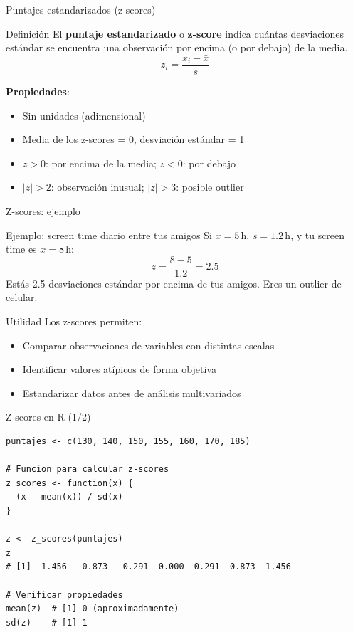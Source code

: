 \documentclass[aspectratio=169, 11pt]{beamer}
\begin{document}
\begin{frame}{Puntajes estandarizados (z-scores)}
\begin{block}{Definición}
El \textbf{puntaje estandarizado} o \textbf{z-score} indica cuántas desviaciones estándar se encuentra una observación por encima (o por debajo) de la media.
\[
z_i = \frac{x_i - \bar{x}}{s}
\]
\end{block}

\textbf{Propiedades}:
\begin{itemize}
\item Sin unidades (adimensional)
\item Media de los z-scores = 0, desviación estándar = 1
\item $z > 0$: por encima de la media; $z < 0$: por debajo
\item $|z| > 2$: observación inusual; $|z| > 3$: posible outlier
\end{itemize}
\end{frame}

\begin{frame}{Z-scores: ejemplo}
\begin{exampleblock}{Ejemplo: screen time diario entre tus amigos}
Si $\bar{x} = 5$\,h, $s = 1.2$\,h, y tu screen time es $x = 8$\,h:
\[
z = \frac{8 - 5}{1.2} = 2.5
\]
Est\'as 2.5 desviaciones est\'andar por encima de tus amigos. Eres un outlier de celular.
\end{exampleblock}

\vspace{1em}
\begin{alertblock}{Utilidad}
Los z-scores permiten:
\begin{itemize}
\item Comparar observaciones de variables con distintas escalas
\item Identificar valores atípicos de forma objetiva
\item Estandarizar datos antes de análisis multivariados
\end{itemize}
\end{alertblock}
\end{frame}

\begin{frame}[fragile]{Z-scores en R (1/2)}
\begin{lstlisting}
puntajes <- c(130, 140, 150, 155, 160, 170, 185)

# Funcion para calcular z-scores
z_scores <- function(x) {
  (x - mean(x)) / sd(x)
}

z <- z_scores(puntajes)
z
# [1] -1.456  -0.873  -0.291  0.000  0.291  0.873  1.456

# Verificar propiedades
mean(z)  # [1] 0 (aproximadamente)
sd(z)    # [1] 1
\end{lstlisting}
\end{frame}
\end{document}

